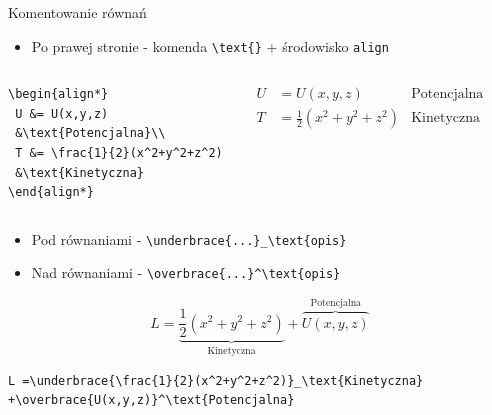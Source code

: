 \documentclass{beamer}
\theoremstyle{newblock}
\begin{document}
\begin{frame}[fragile]{Komentowanie równań}
    \begin{itemize}
        \item Po prawej stronie - komenda \verb|\text{}| + środowisko \verb|align|
    \end{itemize}
        \begin{columns}
                \begin{verbatim}
\begin{align*}
 U &= U(x,y,z) 
 &\text{Potencjalna}\\
 T &= \frac{1}{2}(x^2+y^2+z^2) 
 &\text{Kinetyczna}
\end{align*}      
                \end{verbatim}
                \begin{align*}
                    U &= U(x,y,z) &\text{Potencjalna}\\
                    T &= \frac{1}{2}(x^2+y^2+z^2) &\text{Kinetyczna}
                \end{align*}
        \end{columns}
    \begin{itemize}
        \item Pod równaniami - \verb|\underbrace{...}_\text{opis}|
        \item Nad równaniami - \verb|\overbrace{...}^\text{opis}|
    \end{itemize}

    \begin{equation*}
        L =\underbrace{ \frac{1}{2}(x^2 + y^2 + z^2)}_\text{Kinetyczna} + \overbrace{U(x,y,z)}^\text{Potencjalna}
    \end{equation*}

    \begin{verbatim}
L =\underbrace{\frac{1}{2}(x^2+y^2+z^2)}_\text{Kinetyczna} 
+\overbrace{U(x,y,z)}^\text{Potencjalna}
    \end{verbatim}
\end{frame}
\end{document}

